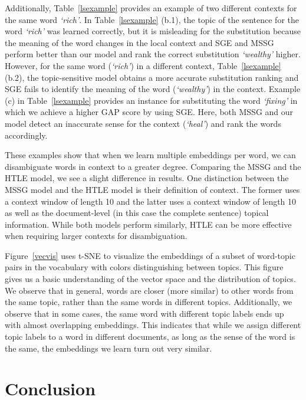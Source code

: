 Additionally, Table~\ref{lsexample} provides an example of two different contexts for the same word \textit{`rich'}. In Table~\ref{lsexample} (b.1), the topic of the sentence for the word \textit{`rich'} was learned correctly, but it is misleading for the substitution because the meaning of the word changes in the local context and SGE and MSSG perform better than our model and rank the correct substitution \textit{`wealthy'} higher. 
However, for the same word (\textit{`rich'}) in a different context, Table~\ref{lsexample} (b.2), the topic-sensitive model obtains a more accurate substitution ranking and SGE fails to identify the meaning of the word (\textit{`wealthy'}) in the context.
Example (c) in Table~\ref{lsexample} provides an instance for substituting the word \textit{`fixing'} in which we achieve a higher GAP score by using SGE. Here, both MSSG and our model detect an inaccurate sense for the context (\textit{`heal'}) and rank the words accordingly. 

These examples show that when we learn multiple embeddings per word, we can disambiguate words in context to a greater degree. 
Comparing the MSSG and the HTLE model, we see a slight difference in results.
One distinction between the MSSG model and the HTLE model is their definition of context.
The former uses a context window of length 10 \citep{neelakantan2014efficient} and the latter uses a context window of length 10 as well as the document-level (in this case the complete sentence) topical information. 
While both models perform similarly, HTLE can be more effective when requiring larger contexts for disambiguation.

Figure~\ref{vecvis} uses t-SNE \citep{7b54165e73a3424b8820136bcf61ca89} to visualize the embeddings of a subset of word-topic pairs in the vocabulary with colors distinguishing between topics. 
This figure gives us a basic understanding of the vector space and the distribution of topics.
We observe that in general, words are closer (more similar) to other words from the same topic, rather than the same words in different topics. 
Additionally, we observe that in some cases, the same word with different topic labels ends up with almost overlapping embeddings. 
This indicates that while we assign different topic labels to a word in different documents, as long as the sense of the word is the same, the embeddings we learn turn out very similar.    
   

\section{Conclusion} \label{embconc}

